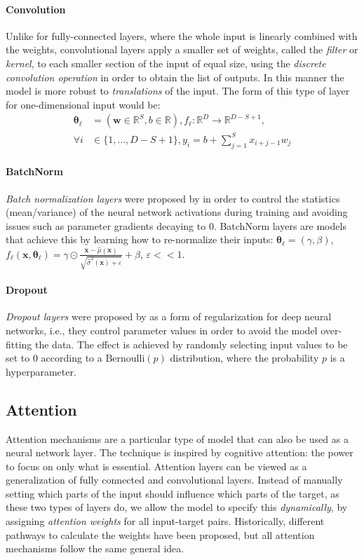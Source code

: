 \paragraph{Convolution} Unlike for fully-connected layers, where the whole input is linearly combined with the weights, convolutional layers apply a smaller set of weights, called the \emph{filter} or \emph{kernel}, to each smaller section of the input of equal size, using the \emph{discrete convolution operation} in order to obtain the list of outputs. In this manner the model is more robust to \emph{translations} of the input. The form of this type of layer for one-dimensional input would be: 
\begin{align}
\pmb{\theta}_{\ell} &= (\pmb{w} \in \mathbb{R}^{S}, b \in \mathbb{R}), f_{\ell}: \mathbb{R}^{D} \to \mathbb{R}^{D-S+1}, \nonumber \\
\forall i &\in \{1,\dots,D-S+1\}, y_i = b + \sum_{j=1}^{S}{x_{i+j-1}w_j}    
\end{align}

\paragraph{BatchNorm} \emph{Batch normalization layers} were proposed by \cite{ioffe_batch_2015} in order to control the statistics (mean/variance) of the neural network activations during training and avoiding issues such as parameter gradients decaying to $0$. BatchNorm layers are models that achieve this by learning how to re-normalize their inputs: $\pmb{\theta}_{\ell} = (\gamma, \beta)$, $f_{\ell}(\pmb{x}, \pmb{\theta}_{\ell}) = \gamma \odot \frac{\pmb{x}-\hat{\mu}(\pmb{x})}{\sqrt{\hat{\sigma}^2(\pmb{x}) + \varepsilon}} + \beta$, $\varepsilon << 1$.

\paragraph{Dropout} \emph{Dropout layers} were proposed by \cite{hinton_improving_2012} as a form of regularization for deep neural networks, i.e., they control parameter values in order to avoid the model over-fitting the data. The effect is achieved by randomly selecting input values to be set to $0$ according to a $\text{Bernoulli}(p)$ distribution, where the probability $p$ is a hyperparameter.
 
\subsection{Attention}
Attention mechanisms are a particular type of model that can also be used as a neural network layer. The technique is inspired by cognitive attention: the power to focus on only what is essential. Attention layers can be viewed as a generalization of fully connected and convolutional layers. Instead of manually setting which parts of the input should influence which parts of the target, as these two types of layers do, we allow the model to specify this \emph{dynamically}, by assigning \emph{attention weights} for all input-target pairs. Historically, different pathways to calculate the weights have been proposed, but all attention mechanisms follow the same general idea.

